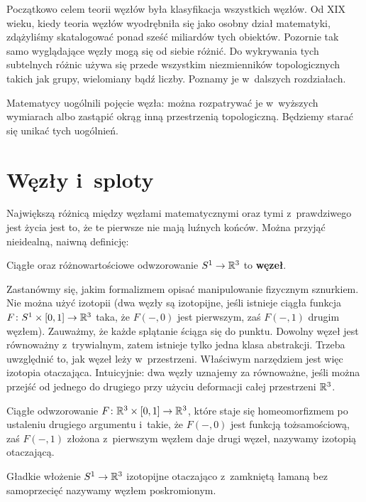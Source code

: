 Początkowo celem teorii węzłów była klasyfikacja wszystkich węzłów.
Od XIX wieku, kiedy teoria węzłów wyodrębniła się jako osobny dział matematyki,
zdążyliśmy skatalogować ponad sześć miliardów tych obiektów.
Pozornie tak samo wyglądające węzły mogą się od siebie różnić.
Do wykrywania tych subtelnych różnic używa się przede wszystkim niezmienników topologicznych takich jak grupy, wielomiany bądź liczby.
Poznamy je w~dalszych rozdziałach.

Matematycy uogólnili pojęcie węzła:
można rozpatrywać je w~wyższych wymiarach albo zastąpić okrąg inną przestrzenią topologiczną.
Będziemy starać się unikać tych uogólnień.

\section{Węzły i~sploty}
Największą różnicą między węzłami matematycznymi oraz tymi z~prawdziwego jest życia jest to, że te pierwsze nie mają luźnych końców.
Można przyjąć nieidealną, naiwną definicję:

\begin{definition}
    Ciągłe oraz różnowartościowe odwzorowanie $S^1 \to \mathbb R^3$ to \textbf{węzeł}.
\end{definition}

Zastanówmy się, jakim formalizmem opisać manipulowanie fizycznym sznurkiem.
Nie można użyć izotopii
(dwa węzły są izotopijne, jeśli istnieje ciągła funkcja $F \colon S^1 \times [0, 1] \to \mathbb R^3$ taka, że $F(-, 0)$ jest pierwszym, zaś $F(-,1)$ drugim węzłem).
Zauważmy, że każde splątanie ściąga się do punktu.
Dowolny węzeł jest równoważny z~trywialnym, zatem istnieje tylko jedna klasa abstrakcji.
Trzeba uwzględnić to, jak węzeł leży w~przestrzeni.
Właściwym narzędziem jest więc izotopia otaczająca.
Intuicyjnie: dwa węzły uznajemy za równoważne,
jeśli można przejść od jednego do drugiego przy użyciu deformacji całej przestrzeni $\mathbb R^3$.

\begin{definition} \label{def_ambient_isotopy}
    Ciągłe odwzorowanie $F \colon \mathbb R^3 \times [0,1] \to \mathbb R^3$,
    które staje się homeomorfizmem po ustaleniu drugiego argumentu i~takie,
    że $F(-, 0)$ jest funkcją tożsamościową,
    zaś $F(-, 1)$ złożona z~pierwszym węzłem daje drugi węzeł,
    nazywamy izotopią otaczającą.
\end{definition}

\begin{definition}[węzeł]
    \label{def:knot}
    Gładkie włożenie $S^1 \to \mathbb R^3$ izotopijne otaczająco z~zamkniętą łamaną bez samoprzecięć nazywamy węzłem poskromionym.
\end{definition}

